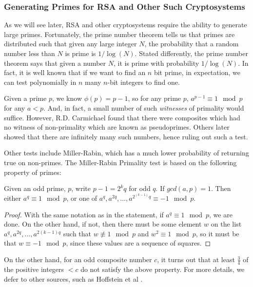 \subsubsection{Generating Primes for RSA and Other Such Cryptosystems}

As we will see later, RSA and other cryptosystems require the ability to generate large primes. Fortunately, the prime number theorem tells us that primes are distributed such that given any large integer $N$, the probability that a random number less than $N$ is prime is $1/\log(N)$. Stated differently, the prime number theorem says that given a number $N$, it is prime with probability $1/\log(N)$. In fact, it is well known that if we want to find an $n$ bit prime, in expectation, we can test polynomially in $n$ many $n$-bit integers to find one.

Given a prime $p$, we know $\phi(p) = p - 1$, so for any prime $p$, $a^{p-1} \equiv 1\mod p$ for any $a < p$. And, in fact, a small number of such \emph{witnesses} of primality would suffice. However, R.D. Carmichael \cite{carmichael1910note} found that there were composites which had no witness of non-primality which are known as pseudoprimes. Others \cite{alfordinfinite} later showed that there are infinitely many such numbers, hence ruling out such a test.

Other tests include Miller-Rabin, which has a much lower probability of returning true on non-primes. The Miller-Rabin Primality test is based on the following property of primes:
\begin{claim}
Given an odd prime, $p$, write $p-1 = 2^k q$ for odd $q$.
If $gcd(a, p) = 1$. Then either $a^q \equiv 1 \mod p$, or one of $a^q, a^{2q},..., a^{2^{(k-1)}q}\equiv -1 \mod p$.
\end{claim}
\begin{proof}
With the same notation as in the statement, if $a^q \equiv 1\mod p$, we are done. On the other hand, if not, then there must be some element $w$ on the list $a^q, a^{2q},..., a^{2{(k-1)}q}$ such that $w\not\equiv 1\mod p$ and $w^2\equiv 1\mod p$, so it must be that $w\equiv -1\mod p$, since these values are a sequence of squares. 
\end{proof}

\begin{remark}
On the other hand, for an odd composite number $c$, it turns out that at least $\frac{3}{4}$ of the positive integers $< c$ do not satisfy the above property. For more details, we defer to other sources, such as Hoffstein et al \cite{hoffstein2008introduction}.
\end{remark}

